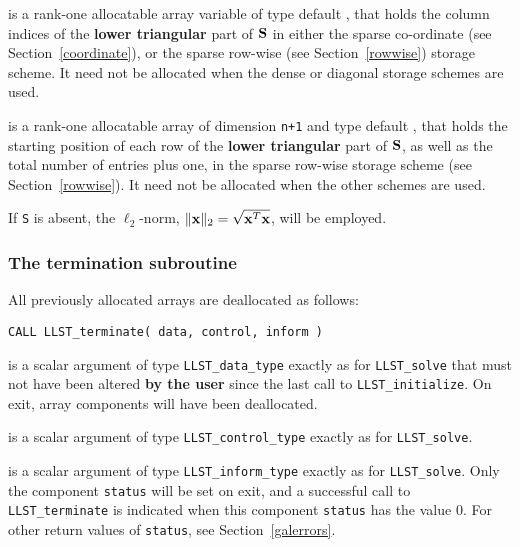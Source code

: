 \documentclass{galahad}
\newcommand{\packagename}{LLST}
\begin{document}
\begin{description}
\begin{description}
 is a rank-one allocatable array variable of type default \integer,
that holds the column indices of the {\bf lower triangular} part of 
${\mathbf{S}}$ in either the sparse co-ordinate 
(see Section~\ref{coordinate}), or the sparse row-wise 
(see Section~\ref{rowwise}) storage scheme.
It need not be allocated when the dense or diagonal storage schemes are used.

 is a rank-one allocatable array of dimension {\tt n+1} and type 
default \integer, that holds the starting position of 
each row of the {\bf lower triangular} part of ${\mathbf{S}}$, as well
as the total number of entries plus one, in the sparse row-wise storage
scheme (see Section~\ref{rowwise}). It need not be allocated when the
other schemes are used.

\end{description}
If {\tt S} is absent, the $\ell_2$-norm, $\|{\mathbf{x}}\|_2 = \sqrt{{\mathbf{x}}^T {\mathbf{x}}}$,
will be employed. 


\end{description}


\subsubsection{The  termination subroutine}
All previously allocated arrays are deallocated as follows:

\hskip0.5in 
{\tt CALL \packagename\_terminate( data, control, inform )}

\begin{description}

 is a scalar \intentinout argument of type 
{\tt \packagename\_data\_type} 
exactly as for
{\tt \packagename\_solve}
that must not have been altered {\bf by the user} since the last call to 
{\tt \packagename\_initialize}.
On exit, array components will have been deallocated. 

 is a scalar \intentin argument of type 
{\tt \packagename\_control\_type}
exactly as for
{\tt \packagename\_solve}.

 is a scalar \intentout argument of type 
{\tt \packagename\_inform\_type}
exactly as for
{\tt \packagename\_solve}.
Only the component {\tt status} will be set on exit, and a 
successful call to 
{\tt \packagename\_terminate}
is indicated when this  component {\tt status} has the value 0. 
For other return values of {\tt status}, see Section~\ref{galerrors}.

\end{description}
\end{document}
